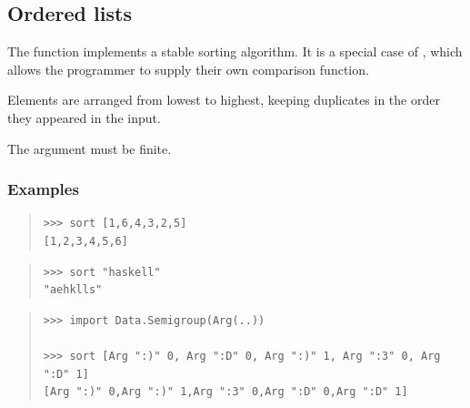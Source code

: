 \subsection{Ordered lists}
\begin{haddockdesc}
\item[\begin{tabular}{@{}l}
sort :: Ord a => {\char 91}a{\char 93} -> {\char 91}a{\char 93}
\end{tabular}]
{\haddockbegindoc
The  function implements a stable sorting algorithm.
 It is a special case of , which allows the programmer to supply
 their own comparison function.\par
Elements are arranged from lowest to highest, keeping duplicates in
 the order they appeared in the input.\par
The argument must be finite.\par
\subsubsection*{\textbf{Examples}}
\begin{quote}
{\haddockverb\begin{verbatim}
>>> sort [1,6,4,3,2,5]
[1,2,3,4,5,6]

\end{verbatim}}
\end{quote}
\begin{quote}
{\haddockverb\begin{verbatim}
>>> sort "haskell"
"aehklls"

\end{verbatim}}
\end{quote}
\begin{quote}
{\haddockverb\begin{verbatim}
>>> import Data.Semigroup(Arg(..))

>>> sort [Arg ":)" 0, Arg ":D" 0, Arg ":)" 1, Arg ":3" 0, Arg ":D" 1]
[Arg ":)" 0,Arg ":)" 1,Arg ":3" 0,Arg ":D" 0,Arg ":D" 1]

\end{verbatim}}
\end{quote}}
\end{haddockdesc}
